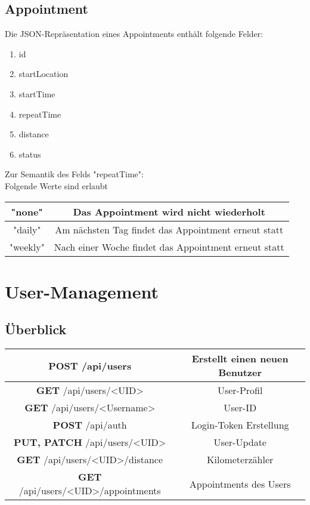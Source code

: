 \documentclass[11pt,a4paper]{article}
\begin{document}
\subsection{Appointment}
Die JSON-Repräsentation eines Appointments enthält folgende Felder:
\begin{enumerate}
    \item id
    \item startLocation
    \item startTime
    \item repeatTime
    \item distance
    \item status
\end{enumerate}
Zur Semantik des Felds "repeatTime":\\
Folgende Werte sind erlaubt

\begin{tabular}{|c|c|}
    \hline
    "none" & Das Appointment wird nicht wiederholt\\
    \hline
    "daily" & Am nächsten Tag findet das Appointment erneut statt\\
    \hline
    "weekly" & Nach einer Woche findet das Appointment erneut statt\\
    \hline
\end{tabular}


\section{User-Management}
\subsection{Überblick}
\begin{tabular}{|c|c|}
\hline
\textbf{POST} /api/users & Erstellt einen neuen Benutzer \\
\hline
\textbf{GET} /api/users/<UID> & User-Profil \\
\hline
\textbf{GET} /api/users/<Username> & User-ID \\
\hline
\textbf{POST} /api/auth & Login-Token Erstellung \\
\hline
\textbf{PUT, PATCH} /api/users/<UID> & User-Update \\
\hline
\textbf{GET} /api/users/<UID>/distance & Kilometerzähler \\
\hline
\textbf{GET} /api/users/<UID>/appointments & Appointments des Users \\
\hline
\end{tabular}
\end{document}
